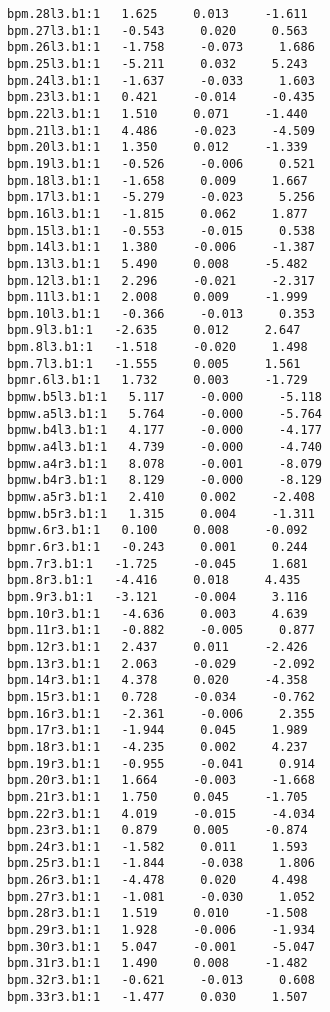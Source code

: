 \begin{verbatim}
bpm.28l3.b1:1   1.625     0.013     -1.611
bpm.27l3.b1:1   -0.543     0.020     0.563
bpm.26l3.b1:1   -1.758     -0.073     1.686
bpm.25l3.b1:1   -5.211     0.032     5.243
bpm.24l3.b1:1   -1.637     -0.033     1.603
bpm.23l3.b1:1   0.421     -0.014     -0.435
bpm.22l3.b1:1   1.510     0.071     -1.440
bpm.21l3.b1:1   4.486     -0.023     -4.509
bpm.20l3.b1:1   1.350     0.012     -1.339
bpm.19l3.b1:1   -0.526     -0.006     0.521
bpm.18l3.b1:1   -1.658     0.009     1.667
bpm.17l3.b1:1   -5.279     -0.023     5.256
bpm.16l3.b1:1   -1.815     0.062     1.877
bpm.15l3.b1:1   -0.553     -0.015     0.538
bpm.14l3.b1:1   1.380     -0.006     -1.387
bpm.13l3.b1:1   5.490     0.008     -5.482
bpm.12l3.b1:1   2.296     -0.021     -2.317
bpm.11l3.b1:1   2.008     0.009     -1.999
bpm.10l3.b1:1   -0.366     -0.013     0.353
bpm.9l3.b1:1   -2.635     0.012     2.647
bpm.8l3.b1:1   -1.518     -0.020     1.498
bpm.7l3.b1:1   -1.555     0.005     1.561
bpmr.6l3.b1:1   1.732     0.003     -1.729
bpmw.b5l3.b1:1   5.117     -0.000     -5.118
bpmw.a5l3.b1:1   5.764     -0.000     -5.764
bpmw.b4l3.b1:1   4.177     -0.000     -4.177
bpmw.a4l3.b1:1   4.739     -0.000     -4.740
bpmw.a4r3.b1:1   8.078     -0.001     -8.079
bpmw.b4r3.b1:1   8.129     -0.000     -8.129
bpmw.a5r3.b1:1   2.410     0.002     -2.408
bpmw.b5r3.b1:1   1.315     0.004     -1.311
bpmw.6r3.b1:1   0.100     0.008     -0.092
bpmr.6r3.b1:1   -0.243     0.001     0.244
bpm.7r3.b1:1   -1.725     -0.045     1.681
bpm.8r3.b1:1   -4.416     0.018     4.435
bpm.9r3.b1:1   -3.121     -0.004     3.116
bpm.10r3.b1:1   -4.636     0.003     4.639
bpm.11r3.b1:1   -0.882     -0.005     0.877
bpm.12r3.b1:1   2.437     0.011     -2.426
bpm.13r3.b1:1   2.063     -0.029     -2.092
bpm.14r3.b1:1   4.378     0.020     -4.358
bpm.15r3.b1:1   0.728     -0.034     -0.762
bpm.16r3.b1:1   -2.361     -0.006     2.355
bpm.17r3.b1:1   -1.944     0.045     1.989
bpm.18r3.b1:1   -4.235     0.002     4.237
bpm.19r3.b1:1   -0.955     -0.041     0.914
bpm.20r3.b1:1   1.664     -0.003     -1.668
bpm.21r3.b1:1   1.750     0.045     -1.705
bpm.22r3.b1:1   4.019     -0.015     -4.034
bpm.23r3.b1:1   0.879     0.005     -0.874
bpm.24r3.b1:1   -1.582     0.011     1.593
bpm.25r3.b1:1   -1.844     -0.038     1.806
bpm.26r3.b1:1   -4.478     0.020     4.498
bpm.27r3.b1:1   -1.081     -0.030     1.052
bpm.28r3.b1:1   1.519     0.010     -1.508
bpm.29r3.b1:1   1.928     -0.006     -1.934
bpm.30r3.b1:1   5.047     -0.001     -5.047
bpm.31r3.b1:1   1.490     0.008     -1.482
bpm.32r3.b1:1   -0.621     -0.013     0.608
bpm.33r3.b1:1   -1.477     0.030     1.507

\end{verbatim}
